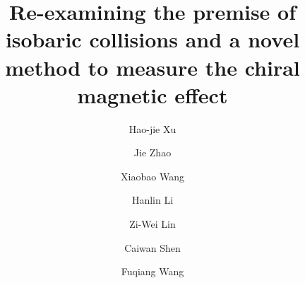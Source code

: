 \documentclass[3p,times,procedia]{elsarticle}
\begin{document}
\begin{frontmatter}




\title{Re-examining the premise of isobaric collisions and a novel method to measure the chiral magnetic effect}

\author[label1]{Hao-jie Xu}
\author[label2]{Jie Zhao}
\author[label1]{Xiaobao Wang}
\author[label3]{Hanlin Li}
\author[label4,label5]{Zi-Wei Lin}
\author[label1]{Caiwan Shen}
\author[label1,label2]{Fuqiang Wang}
\address[label1]{School of Science, Huzhou University, Huzhou, Zhejiang 313000, China}
\address[label2]{Department of Physics and Astronomy, Purdue University, West Lafayette, Indiana 47907, USA}
\address[label3]{College of Science, Wuhan University of Science and Technology, Wuhan, Hubei 430065, China}
\address[label4]{Department of Physics, East Carolina University, Greenville, North Carolina 27858, USA}
\address[label5]{Key Laboratory of Quarks and Lepton Physics (MOE) and Institute of Particle Physics, Central China Normal University, Wuhan, Hubei 430079, China}


\end{frontmatter}
\end{document}
